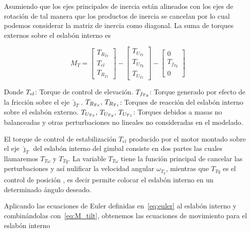 Asumiendo que los ejes principales de inercia est\'{a}n alineados con los ejes de rotaci\'{o}n de tal manera que los productos de inercia se cancelan por lo cual podemos considerar la matriz de inercia como diagonal. La suma de torques externos sobre el eslab\'{o}n interno es 

\begin{equation}
M_T=\left[
\begin{array}{c}
T_{R_{Tx}} \\ T_{el} \\ T_{R_{Tz}}
\end{array}\right] -
\left[\begin{array}{c}
T_{U_{Tx}} \\ T_{U_{Ty}} \\ T_{U_{Tz}}
\end{array}\right]-
\left[
\begin{array}{c}
0 \\ T_{f_{Ty}} \\ 0
\end{array} \right]
\label{eq:M_tilt}
\end{equation}

Donde
$\\T_{el}$: Torque de control de elevaci\'{o}n.
$\\T_{f_{Ty}}$: Torque generado por efecto de la fricci\'{o}n sobre el eje $\hat{\jmath}_{T}$.
$\\T_{R_{Tx}}, \, T_{R_{Tz}}$: Torques de reacci\'{o}n del eslab\'{o}n interno sobre el eslab\'{o}n externo.
$\\T_{U_{Tx}}, \, T_{U_{Ty}}, \, T_{U_{Tz}}$:  Torques debidos a masas no balanceadas y otras perturbaciones no lineales no consideradas en el modelado.\newline 

El torque de control de estabilizaci\'{o}n $T_{el}$ producido por el motor montado sobre el eje $\hat{\jmath}_{T}$ del eslab\'{o}n interno del gimbal consiste en dos partes las cuales llamaremos $T_{T\omega}$ y $T_{Tq}$. La variable $T_{T\omega}$ tiene la funci\'{o}n principal de cancelar las perturbaciones y as\'{i} nulificar la velocidad angular $\omega_{T_y}$, mientras que $T_{Tq}$ es el control de posici\'{o}n , es decir permite colocar el eslab\'{o}n interno en un determinado \'{a}ngulo deseado.

Aplicando las ecuaciones de Euler definidas en~\ref{eq:euler} al eslab\'{o}n interno y combin\'{a}ndolas con~\ref{eq:M_tilt}, obtenemos las ecuaciones de movimiento para el eslab\'{o}n interno


